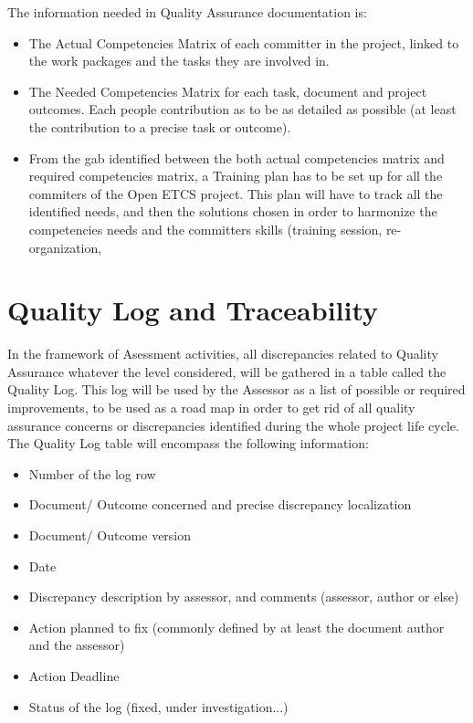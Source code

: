 \documentclass{template/openetcs_report}
\begin{document}
The information needed in Quality Assurance documentation is:
\begin{itemize}
\item The Actual Competencies Matrix of each committer in the project, linked to the work packages and the tasks they are involved in.
\item The Needed Competencies Matrix for each task, document and project outcomes. Each people contribution as to be as detailed as possible (at least the contribution to a precise task or outcome).
\item From the gab identified between the both actual competencies matrix and required competencies matrix, a Training plan has to be set up for all the commiters of the Open ETCS project. This plan will have to track all the identified needs, and then the solutions chosen in order to harmonize the competencies needs and the committers skills (training session, re-organization, 
\end{itemize}

\section{Quality Log and Traceability}
In the framework of Asessment activities, all discrepancies related to Quality Assurance whatever the level considered, will be gathered in a table called the Quality Log. This log will be used by the Assessor as a list of possible or required improvements, to be used as a road map in order to get rid of all quality assurance concerns or discrepancies identified during the whole project life cycle.
The Quality Log table will encompass the following information: 
\begin{itemize}
\item Number of the log row
\item Document/ Outcome concerned and precise discrepancy localization
\item Document/ Outcome version
\item Date
\item Discrepancy description by assessor, and comments (assessor, author or else)
\item Action planned to fix (commonly defined by at least the document author and the assessor)
\item Action Deadline
\item Status of the log (fixed, under investigation...)
\end{itemize}
\end{document}
